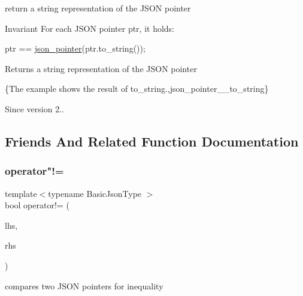 return a string representation of the J\+S\+ON pointer 

\begin{DoxyInvariant}{Invariant}
For each J\+S\+ON pointer {\ttfamily ptr}, it holds\+: 
\begin{DoxyCode}
ptr == \hyperlink{classnlohmann_1_1json__pointer_a7f32d7c62841f0c4a6784cf741a6e4f8}{json\_pointer}(ptr.to\_string());
\end{DoxyCode}

\end{DoxyInvariant}
\begin{DoxyReturn}{Returns}
a string representation of the J\+S\+ON pointer
\end{DoxyReturn}
\{The example shows the result of {\ttfamily to\+\_\+string}.,json\+\_\+pointer\+\_\+\+\_\+to\+\_\+string\}

\begin{DoxySince}{Since}
version 2.. 
\end{DoxySince}


\subsection{Friends And Related Function Documentation}
\mbox{\label{classnlohmann_1_1json__pointer_a6779edcf28e6f018a3bbb29c0b4b5e1e}} 
\subsubsection{\texorpdfstring{operator"!=}{operator!=}}
{\footnotesize\ttfamily template$<$typename Basic\+Json\+Type $>$ \\
bool operator!= (\begin{DoxyParamCaption}\item[{\hyperlink{classnlohmann_1_1json__pointer}{json\+\_\+pointer}$<$ Basic\+Json\+Type $>$ const \&}]{lhs,  }\item[{\hyperlink{classnlohmann_1_1json__pointer}{json\+\_\+pointer}$<$ Basic\+Json\+Type $>$ const \&}]{rhs }\end{DoxyParamCaption})\hspace{0.3cm}{\ttfamily [friend]}}



compares two J\+S\+ON pointers for inequality 


